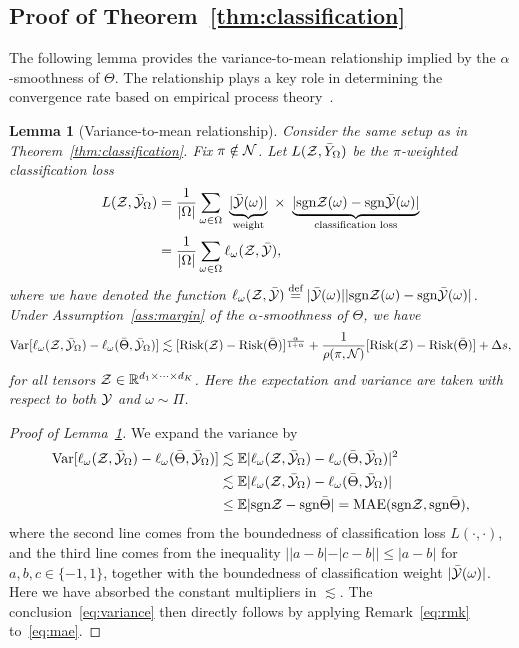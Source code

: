 \documentclass[11pt]{article}
\theoremstyle{plain}
\newtheorem{lem}{Lemma}[section]
\theoremstyle{definition}
\newcommand*{\KeepStyleUnderBrace}[1]{%
  \mathop{%
    \mathchoice
    {\underbrace{\displaystyle#1}}%
    {\underbrace{\textstyle#1}}%
    {\underbrace{\scriptstyle#1}}%
    {\underbrace{\scriptscriptstyle#1}}%
  }\limits
}
\def\sign{\textup{sgn}}
\begin{document}
\subsection{Proof of Theorem~\ref{thm:classification}}
The following lemma provides the variance-to-mean relationship implied by the $\alpha$-smoothness of $\Theta$. The relationship plays a key role in determining the convergence rate based on empirical process theory~\citep{shen1994convergence}. 
\begin{lem}[Variance-to-mean relationship]\label{lem:variance}
Consider the same setup as in Theorem~\ref{thm:classification}. Fix $\pi\notin \mathcal{N}$. Let $L(\mathcal{Z}, \bar Y_\Omega)$ be the $\pi$-weighted classification loss
\begin{align}\label{eq:sample2}
L(\tZ, \bar \tY_\Omega)&= {1\over |\Omega|}\sum_{\omega \in \Omega}\ \KeepStyleUnderBrace{|\bar \tY(\omega)|}_{\text{weight}}\  \times \ \KeepStyleUnderBrace{| \sign \tZ(\omega)-\sign \bar \tY(\omega)|}_{\text{classification loss}}\notag \\
&={1\over |\Omega|}\sum_{\omega \in \Omega}\ell_\omega(\tZ, \bar \tY),
\end{align}
where we have denoted the function $\ell_\omega(\tZ,\bar \tY)\stackrel{\text{def}}{=}|\bar \tY(\omega)||\sign\tZ(\omega)-\sign \bar \tY(\omega)|$. Under Assumption~\ref{ass:margin} of the $\alpha$-smoothness of $\Theta$, we have
\begin{equation}\label{eq:variance}
\textup{Var}[\ell_\omega(\mathcal{Z},\bar {\mathcal{Y}}_{\Omega})-\ell_\omega(\bar \Theta, \bar {\mathcal{Y}}_\Omega)]\lesssim [\textup{Risk}(\mathcal{Z})-\textup{Risk}(\bar \Theta)]^{\alpha \over 1+\alpha}+{1\over \rho(\pi, \mathcal{N})}[\textup{Risk}(\mathcal{Z})-\textup{Risk}(\bar \Theta)]+\Delta s,
\end{equation}
for all tensors $\mathcal{Z}\in\mathbb{R}^{d_1\times \cdots \times d_K}$. Here the expectation and variance are taken with respect to both $\mathcal{Y}$ and $\omega\sim \Pi$. 
\end{lem}
\begin{proof}[Proof of Lemma~\ref{lem:variance}]
We expand the variance by
\begin{align}\label{eq:mae}
\text{Var}[\ell_\omega(\tZ,\bar \tY_\Omega)-\ell_\omega(\bar \Theta, \bar \tY_\Omega)] &\lesssim \mathbb{E}|\ell_\omega(\tZ,\bar \tY_\Omega)-\ell_\omega(\bar \Theta, \bar \tY_\Omega)|^2\notag \\
&\lesssim \mathbb{E}|\ell_\omega(\tZ,\bar \tY_\Omega)-\ell_\omega(\bar \Theta, \bar \tY_\Omega)|\notag \\
&\leq \mathbb{E}|\sign\tZ-\sign \bar \Theta| = \textup{MAE}(\sign\tZ, \sign \bar \Theta),
\end{align}
where the second line comes from the boundedness of classification loss $L(\cdot ,\cdot)$, and the third line comes from the inequality $||a-b|-|c-b||\leq |a-b|$ for $a,b,c\in\{-1,1\}$, together with the boundedness of classification weight $|\bar{\mathcal{Y}}(\omega)|$. Here we have absorbed the constant multipliers in $\lesssim$. The conclusion~\eqref{eq:variance} then directly follows by applying Remark~\ref{eq:rmk} to~\eqref{eq:mae}.
\end{proof}
\end{document}
